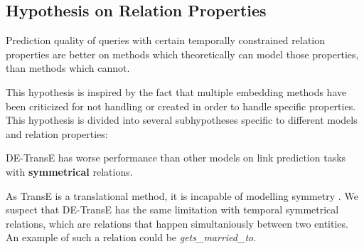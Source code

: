 \subsection{Hypothesis on Relation Properties}
\label{sec:hypothesis_relation_properties}



\begin{hypothesis}
\label{hyp:relation_properties}
Prediction quality of queries with certain temporally constrained relation properties are better on methods which theoretically can model those properties, than methods which cannot.
\end{hypothesis}

This hypothesis is inspired by the fact that multiple embedding methods have been criticized for not handling or created in order to handle specific properties.
This hypothesis is divided into several subhypotheses specific to different models and relation properties:

\begin{subhypothesis}
\label{hyp:relation_property_sym}
DE-TransE has worse performance than other models on link prediction tasks with \textbf{symmetrical} relations.
\end{subhypothesis}

As TransE is a translational method, it is incapable of modelling symmetry \cite{goel19diachronicemb}. We suspect that DE-TransE has the same limitation with temporal symmetrical relations, which are relations that happen simultaniously between two entities. An example of such a relation could be \textit{gets\_married\_to}.


